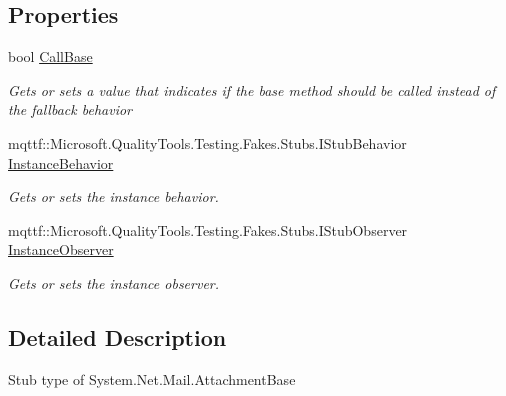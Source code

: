 \subsection*{Properties}
\begin{DoxyCompactItemize}
\item 
bool \hyperlink{class_system_1_1_net_1_1_mail_1_1_fakes_1_1_stub_attachment_base_a03340260052d71f64cbda01dc8b301d4}{Call\-Base}
\begin{DoxyCompactList}\small\item\em Gets or sets a value that indicates if the base method should be called instead of the fallback behavior\end{DoxyCompactList}\item 
mqttf\-::\-Microsoft.\-Quality\-Tools.\-Testing.\-Fakes.\-Stubs.\-I\-Stub\-Behavior \hyperlink{class_system_1_1_net_1_1_mail_1_1_fakes_1_1_stub_attachment_base_aecba8427a1528521931637e88b655ba0}{Instance\-Behavior}
\begin{DoxyCompactList}\small\item\em Gets or sets the instance behavior.\end{DoxyCompactList}\item 
mqttf\-::\-Microsoft.\-Quality\-Tools.\-Testing.\-Fakes.\-Stubs.\-I\-Stub\-Observer \hyperlink{class_system_1_1_net_1_1_mail_1_1_fakes_1_1_stub_attachment_base_a9329fd7f17dee24b335c79ca51588fb5}{Instance\-Observer}
\begin{DoxyCompactList}\small\item\em Gets or sets the instance observer.\end{DoxyCompactList}\end{DoxyCompactItemize}


\subsection{Detailed Description}
Stub type of System.\-Net.\-Mail.\-Attachment\-Base




